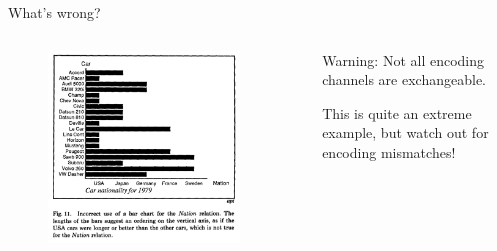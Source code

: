\documentclass[aspectratio=169]{../latex_main/tntbeamer}  %
\begin{document}
	
	\begin{frame}{What’s wrong?}
	\vspace{-2em}
	    \begin{columns}
	        \begin{column}{.5\textwidth}
	        
	              \begin{figure}
	                  \includegraphics[width=0.9\textwidth]{Bild17}
	               \end{figure} 
	               
	        \end{column}
	        
	        \begin{column}{.5\textwidth}
	              
	              \bigskip
	              \bigskip
	              
	              \alert{Warning:} Not all encoding channels are exchangeable.
	              
	              This is quite an extreme example, but watch out for encoding mismatches!
	              
	        \end{column}
	        
	    \end{columns}
	\end{frame}
\end{document}
